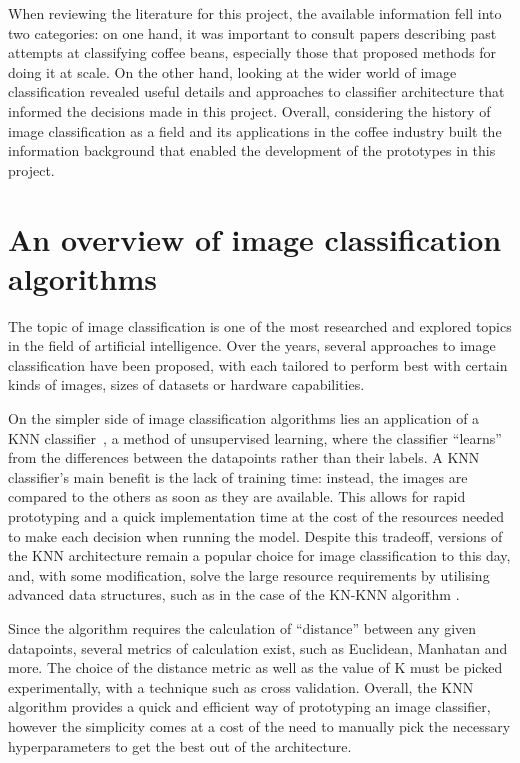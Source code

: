When reviewing the literature for this project, the available information fell into
two categories: on one hand, it was important to consult papers describing past attempts
at classifying coffee beans, especially those that proposed methods for doing it
at scale. On the other hand, looking at the wider world of image classification
revealed useful details and approaches to classifier architecture that informed
the decisions made in this project. Overall, considering the history of image
classification as a field and its applications in the coffee industry built the
information background that enabled the development of the prototypes in this
project.

\section{An overview of image classification algorithms}
\label{sec:lit-review-general} The topic of image classification is one of the
most researched and explored topics in the field of artificial intelligence. Over
the years, several approaches to image classification have been proposed, with each
tailored to perform best with certain kinds of images, sizes of datasets or
hardware capabilities.

On the simpler side of image classification algorithms lies an application of a
KNN classifier~\cite{knnOverview}, a method of unsupervised learning, where the
classifier ``learns'' from the differences between the datapoints rather than
their labels. A KNN classifier's main benefit is the lack of training time:
instead, the images are compared to the others as soon as they are available.
This allows for rapid prototyping and a quick implementation time at the cost of
the resources needed to make each decision when running the model. Despite this tradeoff,
versions of the KNN architecture remain a popular choice for image
classification to this day, and, with some modification, solve the large resource
requirements by utilising advanced data structures, such as in the case of the
KN-KNN algorithm \cite{kdtreeKNN}.

Since the algorithm requires the calculation of ``distance'' between any given
datapoints, several metrics of calculation exist, such as Euclidean, Manhatan and
more. The choice of the distance metric as well as the value of K must be picked
experimentally, with a technique such as cross validation. Overall, the KNN algorithm
provides a quick and efficient way of prototyping an image classifier, however
the simplicity comes at a cost of the need to manually pick the necessary
hyperparameters to get the best out of the architecture.

